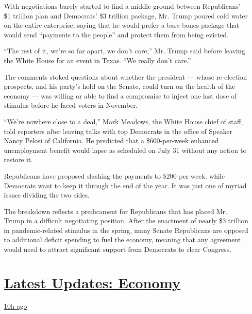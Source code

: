 With negotiations barely started to find a middle ground between
Republicans' \$1 trillion plan and Democrats' \$3 trillion package, Mr.
Trump poured cold water on the entire enterprise, saying that he would
prefer a bare-bones package that would send ``payments to the people''
and protect them from being evicted.

``The rest of it, we're so far apart, we don't care,'' Mr. Trump said
before leaving the White House for an event in Texas. ``We really don't
care.''

The comments stoked questions about whether the president --- whose
re-election prospects, and his party's hold on the Senate, could turn on
the health of the economy --- was willing or able to find a compromise
to inject one last dose of stimulus before he faced voters in November.

``We're nowhere close to a deal,'' Mark Meadows, the White House chief
of staff, told reporters after leaving talks with top Democrats in the
office of Speaker Nancy Pelosi of California. He predicted that a
\$600-per-week enhanced unemployment benefit would lapse as scheduled on
July 31 without any action to restore it.

Republicans have proposed slashing the payments to \$200 per week, while
Democrats want to keep it through the end of the year. It was just one
of myriad issues dividing the two sides.

The breakdown reflects a predicament for Republicans that has placed Mr.
Trump in a difficult negotiating position. After the enactment of nearly
\$3 trillion in pandemic-related stimulus in the spring, many Senate
Republicans are opposed to additional deficit spending to fuel the
economy, meaning that any agreement would need to attract significant
support from Democrats to clear Congress.

\hypertarget{latest-updates-economy}{%
\section{\texorpdfstring{\href{https://www.nytimes.com/live/2020/08/04/business/stock-market-today-coronavirus?action=click\&pgtype=Article\&state=default\&region=MAIN_CONTENT_1\&context=storylines_live_updates}{Latest
Updates:
Economy}}{Latest Updates: Economy}}\label{latest-updates-economy}}

\href{https://www.nytimes.com/live/2020/08/04/business/stock-market-today-coronavirus?action=click\&pgtype=Article\&state=default\&region=MAIN_CONTENT_1\&context=storylines_live_updates\#fox-corporations-plunging-profit-is-cushioned-by-fox-news}{10h
ago}

